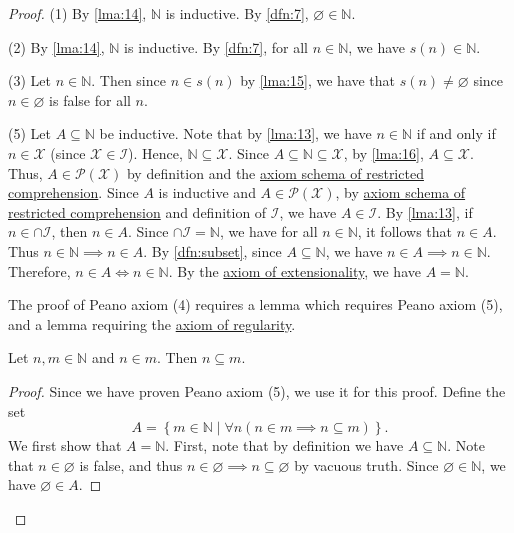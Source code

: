 \documentclass{article}
\begin{document}
\begin{proof}
	(1) By \cref{lma:14}, $\mathbb{N} $ is inductive. By \cref{dfn:7}, $\varnothing \in \mathbb{N}$.

	(2) By \cref{lma:14}, $\mathbb{N} $ is inductive. By \cref{dfn:7}, for all $n\in\mathbb{N} $, we have $s(n)\in\mathbb{N} $.

	(3) Let $n\in\mathbb{N} $. Then since $n\in s(n)$ by \cref{lma:15}, we have that $s(n) \neq \varnothing $ since $n\in \varnothing $ is false for all $n$.

	(5) Let $A\subseteq \mathbb{N} $ be inductive. Note that by \cref{lma:13}, we have $n\in\mathbb{N} $ if and only if $n\in \mathcal{X} $ (since $\mathcal{X} \in \mathcal{I} $). Hence, $\mathbb{N} \subseteq \mathcal{X} $. Since $A \subseteq \mathbb{N} \subseteq \mathcal{X} $, by \cref{lma:16}, $A\subseteq \mathcal{X} $. Thus, $A\in \mathcal{P} (\mathcal{X} )$ by definition and the \hyperref[axiom:comprehension]{axiom schema of restricted comprehension}. Since $A$ is inductive and $A\in \mathcal{P} (\mathcal{X} )$, by \hyperref[axiom:comprehension]{axiom schema of restricted comprehension} and definition of $\mathcal{I} $, we have $A\in \mathcal{I} $. By \cref{lma:13}, if $n\in \cap \mathcal{I} $, then $n\in A$. Since $\cap \mathcal{I} =\mathbb{N} $, we have for all $n\in \mathbb{N} $, it follows that $n\in A$. Thus $n\in \mathbb{N} \implies n\in A$. By \cref{dfn:subset}, since $A\subseteq \mathbb{N} $, we have $n\in A \implies n\in\mathbb{N} $. Therefore, $n\in A \iff n\in\mathbb{N} $. By the \hyperref[axiom:extensionality]{axiom of extensionality}, we have $A=\mathbb{N} $.

	The proof of Peano axiom (4) requires a lemma which requires Peano axiom (5), and a lemma requiring the \hyperref[regularity]{axiom of regularity}.

	\begin{lemma}\label{lma:18}
		Let $n,m\in\mathbb{N} $ and $n\in m$. Then $n\subseteq m$.
	\end{lemma}
	\begin{proof}
		Since we have proven Peano axiom (5), we use it for this proof. Define the set
		\[
			A = \left\{ m\in\mathbb{N} \mid \forall n(n\in m \implies n \subseteq m) \right\} 
		.\]
		We first show that $A=\mathbb{N} $. First, note that by definition we have $A \subseteq \mathbb{N} $. Note that $n\in \varnothing $ is false, and thus $n\in \varnothing \implies n \subseteq \varnothing $ by vacuous truth. Since $\varnothing \in\mathbb{N} $, we have $\varnothing \in A$.


\end{proof}
\end{proof}
\end{document}
